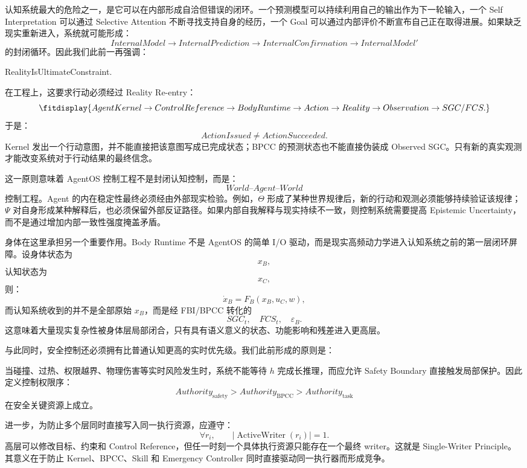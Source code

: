 认知系统最大的危险之一，是它可以在内部形成自洽但错误的闭环。一个预测模型可以持续利用自己的输出作为下一轮输入，一个 Self Interpretation 可以通过 Selective Attention 不断寻找支持自身的经历，一个 Goal 可以通过内部评价不断宣布自己正在取得进展。如果缺乏现实重新进入，系统就可能形成：
\[
InternalModel
\rightarrow
InternalPrediction
\rightarrow
InternalConfirmation
\rightarrow
InternalModel'
\]
的封闭循环。因此我们此前一再强调：
\begin{statementbox}
RealityIsUltimateConstraint.
\end{statementbox}

在工程上，这要求行动必须经过 Reality Re-entry：
\[
\fitdisplay{
AgentKernel
\rightarrow
ControlReference
\rightarrow
BodyRuntime
\rightarrow
Action
\rightarrow
Reality
\rightarrow
Observation
\rightarrow
SGC/FCS.
}
\]
于是：
\[
\boxed{
ActionIssued
\neq
ActionSucceeded.
}
\]
Kernel 发出一个行动意图，并不能直接把该意图写成已完成状态；BPCC 的预测状态也不能直接伪装成 Observed SGC。只有新的真实观测才能改变系统对于行动结果的最终信念。

这一原则意味着 AgentOS 控制工程不是封闭认知控制，而是：
\[
\boxed{
World\text{--}Agent\text{--}World
}
\]
控制工程。Agent 的内在稳定性最终必须经由外部现实检验。例如，$\Theta$ 形成了某种世界规律后，新的行动和观测必须能够持续验证该规律；$\Psi$ 对自身形成某种解释后，也必须保留外部反证路径。如果内部自我解释与现实持续不一致，则控制系统需要提高 Epistemic Uncertainty，而不是通过增加内部一致性强度掩盖矛盾。

身体在这里承担另一个重要作用。Body Runtime 不是 AgentOS 的简单 I/O 驱动，而是现实高频动力学进入认知系统之前的第一层闭环屏障。设身体状态为
\[
x_B,
\]
认知状态为
\[
x_C,
\]
则：
\[
\dot x_B
=
F_B(
x_B,u_C,w
),
\]
而认知系统收到的并不是全部原始 $x_B$，而是经 FBI/BPCC 转化的
\[
SGC_t,\quad FCS_t,\quad \varepsilon_B.
\]
这意味着大量现实复杂性被身体层局部闭合，只有具有语义意义的状态、功能影响和残差进入更高层。

与此同时，安全控制还必须拥有比普通认知更高的实时优先级。我们此前形成的原则是：
\begin{statementbox}
\centering
{}
\end{statementbox}
当碰撞、过热、权限越界、物理伤害等实时风险发生时，系统不能等待 $h$ 完成长推理，而应允许 Safety Boundary 直接触发局部保护。因此定义控制权限序：
\[
Authority_{\mathrm{safety}}
>
Authority_{\mathrm{BPCC}}
>
Authority_{\mathrm{task}}
\]
在安全关键资源上成立。

进一步，为防止多个层同时直接写入同一执行资源，应遵守：
\[
\boxed{
\forall r_i,\qquad
|\operatorname{ActiveWriter}(r_i)|=1.
}
\]
高层可以修改目标、约束和 Control Reference，但任一时刻一个具体执行资源只能存在一个最终 writer。这就是 Single-Writer Principle。其意义在于防止 Kernel、BPCC、Skill 和 Emergency Controller 同时直接驱动同一执行器而形成竞争。

